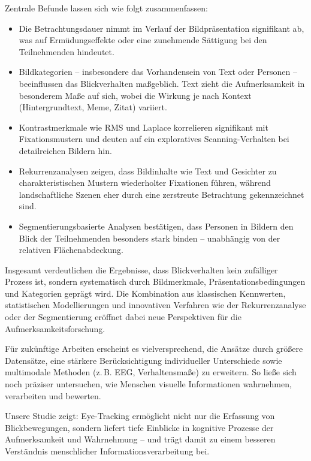 \documentclass[
    language=german, %
    thesis=seminar, %
    supervisor=postdoc, %
    multiauthor=true, %
    ]{settings/csssa-thesis}
\begin{document}
Zentrale Befunde lassen sich wie folgt zusammenfassen: 
\begin{itemize}
    \item Die Betrachtungsdauer nimmt im Verlauf der Bildpräsentation signifikant ab, 
    was auf Ermüdungseffekte oder eine zunehmende Sättigung bei den Teilnehmenden hindeutet. 
    \item Bildkategorien – insbesondere das Vorhandensein von Text oder Personen – 
    beeinflussen das Blickverhalten ma{\ss}geblich. Text zieht die Aufmerksamkeit in besonderem Ma{\ss}e auf sich, 
    wobei die Wirkung je nach Kontext (Hintergrundtext, Meme, Zitat) variiert. 
    \item Kontrastmerkmale wie RMS und Laplace korrelieren signifikant mit Fixationsmustern 
    und deuten auf ein exploratives Scanning-Verhalten bei detailreichen Bildern hin. 
    \item Rekurrenzanalysen zeigen, dass Bildinhalte wie Text und Gesichter zu charakteristischen 
    Mustern wiederholter Fixationen führen, während landschaftliche Szenen eher durch eine zerstreute 
    Betrachtung gekennzeichnet sind. 
    \item Segmentierungsbasierte Analysen bestätigen, dass Personen in Bildern 
    den Blick der Teilnehmenden besonders stark binden – unabhängig von der relativen Flächenabdeckung. 
\end{itemize}
\hfill
\newline Insgesamt verdeutlichen die Ergebnisse, dass Blickverhalten kein zufälliger Prozess ist, 
sondern systematisch durch Bildmerkmale, Präsentationsbedingungen und Kategorien geprägt wird. 
Die Kombination aus klassischen Kennwerten, statistischen Modellierungen und innovativen Verfahren 
wie der Rekurrenzanalyse oder der Segmentierung eröffnet dabei neue Perspektiven für die 
Aufmerksamkeitsforschung. 

Für zukünftige Arbeiten erscheint es vielversprechend, die Ansätze durch grö{\ss}ere Datensätze, 
eine stärkere Berücksichtigung individueller Unterschiede sowie multimodale Methoden (z.\,B. EEG, 
Verhaltensma{\ss}e) zu erweitern. So lie{\ss}e sich noch präziser untersuchen, wie Menschen visuelle 
Informationen wahrnehmen, verarbeiten und bewerten.  

Unsere Studie zeigt: Eye-Tracking ermöglicht nicht nur die Erfassung von Blickbewegungen, 
sondern liefert tiefe Einblicke in kognitive Prozesse der Aufmerksamkeit und Wahrnehmung – 
und trägt damit zu einem besseren Verständnis menschlicher Informationsverarbeitung bei. 
\end{document}
